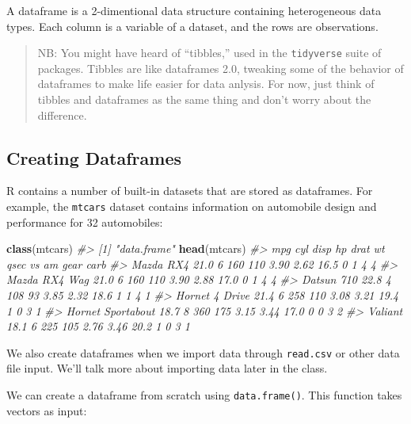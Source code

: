 \documentclass[]{book}
\newenvironment{Shaded}{\begin{snugshade}}{\end{snugshade}}
\newcommand{\KeywordTok}[1]{\textcolor[rgb]{0.13,0.29,0.53}{\textbf{#1}}}
\newcommand{\CommentTok}[1]{\textcolor[rgb]{0.56,0.35,0.01}{\textit{#1}}}
\newcommand{\NormalTok}[1]{#1}
\begin{document}
A dataframe is a 2-dimentional data structure containing heterogeneous
data types. Each column is a variable of a dataset, and the rows are
observations.

\begin{quote}
NB: You might have heard of ``tibbles,'' used in the \texttt{tidyverse}
suite of packages. Tibbles are like dataframes 2.0, tweaking some of the
behavior of dataframes to make life easier for data anlysis. For now,
just think of tibbles and dataframes as the same thing and don't worry
about the difference.
\end{quote}

\subsection{Creating Dataframes}\label{creating-dataframes}

R contains a number of built-in datasets that are stored as dataframes.
For example, the \texttt{mtcars} dataset contains information on
automobile design and performance for 32 automobiles:

\begin{Shaded}
\begin{Highlighting}[]
\KeywordTok{class}\NormalTok{(mtcars)}
\CommentTok{#> [1] "data.frame"}
\KeywordTok{head}\NormalTok{(mtcars)}
\CommentTok{#>                    mpg cyl disp  hp drat   wt qsec vs am gear carb}
\CommentTok{#> Mazda RX4         21.0   6  160 110 3.90 2.62 16.5  0  1    4    4}
\CommentTok{#> Mazda RX4 Wag     21.0   6  160 110 3.90 2.88 17.0  0  1    4    4}
\CommentTok{#> Datsun 710        22.8   4  108  93 3.85 2.32 18.6  1  1    4    1}
\CommentTok{#> Hornet 4 Drive    21.4   6  258 110 3.08 3.21 19.4  1  0    3    1}
\CommentTok{#> Hornet Sportabout 18.7   8  360 175 3.15 3.44 17.0  0  0    3    2}
\CommentTok{#> Valiant           18.1   6  225 105 2.76 3.46 20.2  1  0    3    1}
\end{Highlighting}
\end{Shaded}

We also create dataframes when we import data through \texttt{read.csv}
or other data file input. We'll talk more about importing data later in
the class.

We can create a dataframe from scratch using \texttt{data.frame()}. This
function takes vectors as input:
\end{document}
